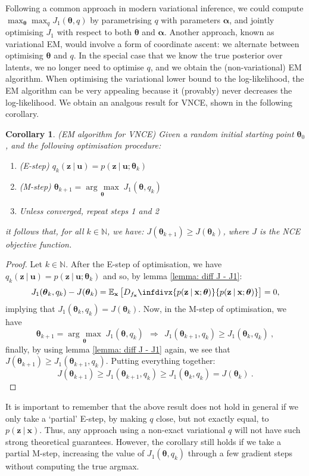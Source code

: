 \documentclass[11pt, oneside]{article}
\newcommand{\thetab}{{\boldsymbol{\theta}}}
\newcommand{\alphab}{{\boldsymbol{\alpha}}}
\renewcommand{\u}{{\mathbf u}}
\newcommand{\x}{{\mathbf x}}
\newcommand{\z}{{\mathbf z}}
\newcommand{\E}{\mathbb{E}}
\newcommand{\Ex}{\E_{\x}}
\newcommand\given[1][]{\:#1\vert\:}
\newcommand{\infdiv}[1]{D_{#1}\infdivx}
\newtheorem{corollary}{Corollary}[theorem]
\theoremstyle{definition}
\newcommand{\argmax}[1]{\underset{#1}{\operatorname{arg}\,\operatorname{max}}\;}
\begin{document}
Following a common approach in modern variational inference, we could compute $\max_{\thetab} \max_{q} J_1(\thetab, q)$ by parametrising $q$ with parameters $\alphab$, and jointly optimising $J_1$ with respect to both $\thetab$ and $\alphab$. Another approach, known as variational EM, would involve a form of coordinate ascent: we alternate between optimising $\thetab$ and $q$. In the special case that we know the true posterior over latents, we no longer need to optimise $q$, and we obtain the (non-variational) EM algorithm. When optimising the variational lower bound to the log-likelihood, the EM algorithm can be very appealing because it (provably) never decreases the log-likelihood. We obtain an analgous result for VNCE, shown in the following corollary.
\begin{corollary}{(EM algorithm for VNCE)}
    Given a random initial starting point $\thetab_0$, and the following optimisation procedure:
    \begin{enumerate}
        \item (E-step) $q_k(\z \given \u) = p(\z \given \u ; \thetab_k) $ 
        \item (M-step) $\thetab_{k+1} = \argmax{\thetab} J_1(\thetab, q_k) $ 
        \item Unless converged, repeat steps 1 and 2
    \end{enumerate}
it follows that, for all $k \in \mathbb{N}$, we have:  $J(\thetab_{k+1}) \geq J(\thetab_k)$, where $J$ is the NCE objective function.
\end{corollary}
\begin{proof}
    Let $k \in \mathbb{N}$. After the E-step of optimisation, we have $q_k(\z \given \u) = p(\z \given \u ; \thetab_k)$ and so, by lemma \ref{lemma: diff J - J1}:
    \begin{align}
        J_1(\thetab_k, q_k) - J(\thetab_k) 
        = \Ex \left[ \infdiv{f_{\x}}{p(\z \given \x; \thetab)}{p(\z \given \x; \thetab)} \right]
        = 0,
    \end{align}
    implying that $J_1(\thetab_k, q_k) = J(\thetab_k)$. Now, in the M-step of optimisation, we have
    \begin{equation}
        \thetab_{k+1} = \argmax{\thetab} J_1(\thetab, q_k) \ \ \Longrightarrow \ \  J_1(\thetab_{k+1}, q_k) \geq J_1(\thetab_k, q_k) \ , 
    \end{equation}
    finally, by using lemma \ref{lemma: diff J - J1} again, we see that $J(\thetab_{k+1}) \geq J_1(\thetab_{k+1}, q_k)$. Putting everything together:
    \begin{equation}
        J(\thetab_{k+1}) \geq J_1(\thetab_{k+1}, q_k)  \geq J_1(\thetab_k, q_k) = J(\thetab_k) \ .
    \end{equation}
\end{proof}
It is important to remember that the above result does not hold in general if we only take a `partial' E-step, by making $q$ close, but not exactly equal, to $p(\z \given \x)$. Thus, any approach using a non-exact variational $q$ will not have such strong theoretical guarantees. However, the corollary still holds if we take a partial M-step, increasing the value of $J_1(\thetab, q_k)$ through a few gradient steps without computing the true argmax.
\end{document}
